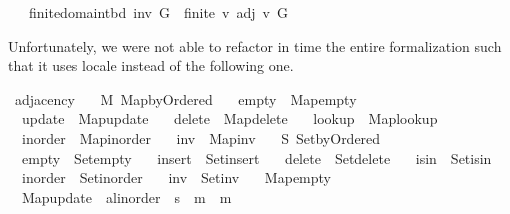 \begin{isabellebody}
\ \ \ finite{\isacharunderscore}{\kern0pt}domain{\isacharunderscore}{\kern0pt}tbd{\isacharcolon}{\kern0pt}\ {\isachardoublequoteopen}inv\ G\ {\isasymLongrightarrow}\ finite\ {\isacharbraceleft}{\kern0pt}v{\isachardot}{\kern0pt}\ adj\ v\ G\ {\isasymnoteq}\ {\isacharbrackleft}{\kern0pt}{\isacharbrackright}{\kern0pt}{\isacharbraceright}{\kern0pt}{\isachardoublequoteclose}%
\begin{isamarkuptext}%
Unfortunately, we were not able to refactor in time the entire formalization such that it uses
locale  instead of the following one.%
\end{isamarkuptext}\isamarkuptrue%
\isamarkupfalse%
\ adjacency\ {\isacharequal}{\kern0pt}\isanewline
\ \ M{\isacharcolon}{\kern0pt}\ Map{\isacharunderscore}{\kern0pt}by{\isacharunderscore}{\kern0pt}Ordered\ \isanewline
\ \ empty\ {\isacharequal}{\kern0pt}\ Map{\isacharunderscore}{\kern0pt}empty\ \isanewline
\ \ update\ {\isacharequal}{\kern0pt}\ Map{\isacharunderscore}{\kern0pt}update\ \isanewline
\ \ delete\ {\isacharequal}{\kern0pt}\ Map{\isacharunderscore}{\kern0pt}delete\ \isanewline
\ \ lookup\ {\isacharequal}{\kern0pt}\ Map{\isacharunderscore}{\kern0pt}lookup\ \isanewline
\ \ inorder\ {\isacharequal}{\kern0pt}\ Map{\isacharunderscore}{\kern0pt}inorder\ \isanewline
\ \ inv\ {\isacharequal}{\kern0pt}\ Map{\isacharunderscore}{\kern0pt}inv\ {\isacharplus}{\kern0pt}\isanewline
\ \ S{\isacharcolon}{\kern0pt}\ Set{\isacharunderscore}{\kern0pt}by{\isacharunderscore}{\kern0pt}Ordered\ \isanewline
\ \ empty\ {\isacharequal}{\kern0pt}\ Set{\isacharunderscore}{\kern0pt}empty\ \isanewline
\ \ insert\ {\isacharequal}{\kern0pt}\ Set{\isacharunderscore}{\kern0pt}insert\ \isanewline
\ \ delete\ {\isacharequal}{\kern0pt}\ Set{\isacharunderscore}{\kern0pt}delete\ \isanewline
\ \ isin\ {\isacharequal}{\kern0pt}\ Set{\isacharunderscore}{\kern0pt}isin\ \isanewline
\ \ inorder\ {\isacharequal}{\kern0pt}\ Set{\isacharunderscore}{\kern0pt}inorder\ \isanewline
\ \ inv\ {\isacharequal}{\kern0pt}\ Set{\isacharunderscore}{\kern0pt}inv\ \isanewline
\ \ Map{\isacharunderscore}{\kern0pt}empty\ \isanewline
\ \ Map{\isacharunderscore}{\kern0pt}update\ {\isacharcolon}{\kern0pt}{\isacharcolon}{\kern0pt}\ {\isachardoublequoteopen}{\isacharprime}{\kern0pt}a{\isacharcolon}{\kern0pt}{\isacharcolon}{\kern0pt}linorder\ {\isasymRightarrow}\ {\isacharprime}{\kern0pt}s\ {\isasymRightarrow}\ {\isacharprime}{\kern0pt}m\ {\isasymRightarrow}\ {\isacharprime}{\kern0pt}m{\isachardoublequoteclose}\ \isanewline

\end{isabellebody}
